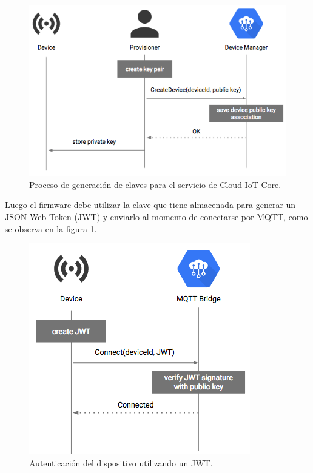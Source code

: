 \begin{figure}[h]
\centering
\includegraphics[scale=0.55]{./Figures/device_key.png}
\caption[Proceso de generación de claves para el servicio de Cloud IoT Core.]{Proceso de generación de claves para el servicio de Cloud IoT Core.\footnotemark}
\label{fig:device_key}
\end{figure}



Luego el firmware debe utilizar la clave que tiene almacenada para generar un JSON Web Token (JWT) \citep{jwt} y enviarlo al momento de conectarse por MQTT, como se observa en la figura \ref{fig:device_key}.

\begin{figure}[h]
\centering
\includegraphics[scale=0.7]{./Figures/device_jwt.png}
\caption[Autenticación del dispositivo utilizando un JWT.]{Autenticación del dispositivo utilizando un JWT.\footnotemark}
\label{fig:device_jwt}
\end{figure}


